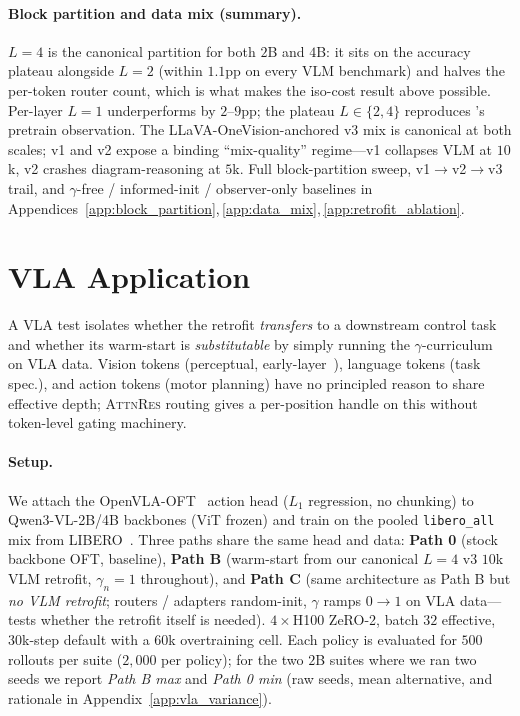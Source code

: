 \documentclass{article}
\newcommand{\attnres}{\textsc{AttnRes}}
\begin{document}
\paragraph{Block partition and data mix (summary).}
$L{=}4$ is the canonical partition for both $2$B and $4$B: it sits on the accuracy plateau alongside $L{=}2$ (within $1.1$pp on every VLM benchmark) and halves the per-token router count, which is what makes the iso-cost result above possible. Per-layer $L{=}1$ underperforms by $2$--$9$pp; the plateau $L\in\{2,4\}$ reproduces \citet{chen2026attnres}'s pretrain observation. The LLaVA-OneVision-anchored v3 mix is canonical at both scales; v1 and v2 expose a binding ``mix-quality'' regime---v1 collapses VLM at $10$k, v2 crashes diagram-reasoning at $5$k. Full block-partition sweep, v1$\to$v2$\to$v3 trail, and $\gamma$-free / informed-init / observer-only baselines in Appendices~\ref{app:block_partition},\,\ref{app:data_mix},\,\ref{app:retrofit_ablation}.


\section{VLA Application}
\label{sec:vla}

A VLA test isolates whether the retrofit \emph{transfers} to a downstream control task and whether its warm-start is \emph{substitutable} by simply running the $\gamma$-curriculum on VLA data. Vision tokens (perceptual, early-layer~\citep{raghu2021vision}), language tokens (task spec.), and action tokens (motor planning) have no principled reason to share effective depth; \attnres{} routing gives a per-position handle on this without token-level gating machinery.

\paragraph{Setup.}
We attach the OpenVLA-OFT~\citep{kim2025openvlaoft} action head ($L_1$ regression, no chunking) to Qwen3-VL-2B/4B backbones (ViT frozen) and train on the pooled \texttt{libero\_all} mix from LIBERO~\citep{liu2023libero}. Three paths share the same head and data: \textbf{Path 0} (stock backbone OFT, baseline), \textbf{Path B} (warm-start from our canonical $L{=}4$ v3 $10$k VLM retrofit, $\gamma_n{=}1$ throughout), and \textbf{Path C} (same architecture as Path B but \emph{no VLM retrofit}; routers / adapters random-init, $\gamma$ ramps $0{\to}1$ on VLA data---tests whether the retrofit itself is needed). $4{\times}$H100 ZeRO-2, batch $32$ effective, $30$k-step default with a $60$k overtraining cell. Each policy is evaluated for $500$ rollouts per suite ($2{,}000$ per policy); for the two $2$B suites where we ran two seeds we report \emph{Path B max} and \emph{Path 0 min} (raw seeds, mean alternative, and rationale in Appendix~\ref{app:vla_variance}).
\end{document}
